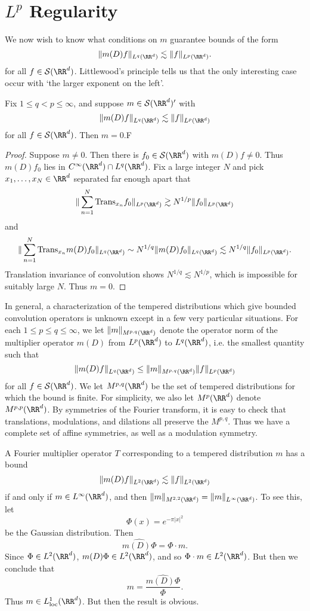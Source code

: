 \section{$L^p$ Regularity}

We now wish to know what conditions on $m$ guarantee bounds of the form
%
\[ \| m(D) f \|_{L^q(\RR^d)} \lesssim \| f \|_{L^p(\RR^d)}. \]
%
for all $f \in \mathcal{S}(\RR^d)$. Littlewood's principle tells us that the only interesting case occur with `the larger exponent on the left'.

\begin{theorem}
  Fix $1 \leq q < p \leq \infty$, and suppose $m \in \mathcal{S}(\RR^d)'$ with
  \[ \| m(D) f \|_{L^q(\RR^d)} \lesssim \| f \|_{L^p(\RR^d)} \]
  for all $f \in \mathcal{S}(\RR^d)$. Then $m = 0$.F
\end{theorem}
\begin{proof}
  Suppose $m \neq 0$. Then there is $f_0 \in \mathcal{S}(\RR^d)$ with $m(D) f \neq 0$. Thus $m(D) f_0$ lies in $C^\infty(\RR^d) \cap L^q(\RR^d)$. Fix a large integer $N$ and pick $x_1,\dots,x_N \in \RR^d$ separated far enough apart that
  \[ \| \sum_{n = 1}^N \text{Trans}_{x_n} f_0 \|_{L^p(\RR^d)} \gtrsim N^{1/p} \| f_0 \|_{L^p(\RR^d)} \]
  and
  \[ \| \sum_{n = 1}^N \text{Trans}_{x_n} m(D) f_0 \|_{L^q(\RR^d)} \sim N^{1/q} \| m(D) f_0 \|_{L^q(\RR^d)} \lesssim N^{1/q} \| f_0 \|_{L^p(\RR^d)}. \]
  Translation invariance of convolution shows $N^{1/q} \lesssim N^{1/p}$, which is impossible for suitably large $N$. Thus $m = 0$.
\end{proof}

In general, a characterization of the tempered distributions which give bounded convolution operators is unknown except in a few very particular situations. For each $1 \leq p \leq q \leq \infty$, we let $\| m \|_{M^{p,q}(\RR^d)}$ denote the operator norm of the multiplier operator $m(D)$ from $L^p(\RR^d)$ to $L^q(\RR^d)$, i.e. the smallest quantity such that
%
\[ \| m(D) f \|_{L^q(\RR^d)} \leq \| m \|_{M^{p,q}(\RR^d)} \| f \|_{L^p(\RR^d)} \]
%
for all $f \in \mathcal{S}(\RR^d)$. We let $M^{p,q}(\RR^d)$ be the set of tempered distributions for which the bound is finite. For simplicity, we also let $M^p(\RR^d)$ denote $M^{p,p}(\RR^d)$. By symmetries of the Fourier transform, it is easy to check that translations, modulations, and dilations all preserve the $M^{p,q}$. Thus we have a complete set of affine symmetries, as well as a modulation symmetry.

\begin{example}
  A Fourier multiplier operator $T$ corresponding to a tempered distribution $m$ has a bound
  \[ \| m(D)f \|_{L^2(\RR^d)} \lesssim \| f \|_{L^2(\RR^d)} \]
  if and only if $m \in L^\infty(\RR^d)$, and then $\| m \|_{M^{2,2}(\RR^d)} = \| m \|_{L^\infty(\RR^d)}$. To see this, let
  \[ \Phi(x) = e^{- \pi |x|^2} \]
  be the Gaussian distribution. Then
  \[ \widehat{m(D) \Phi} = \Phi \cdot m. \]
  Since $\Phi \in L^2(\RR^d)$, $m(D) \Phi \in L^2(\RR^d)$, and so $\Phi \cdot m \in L^2(\RR^d)$. But then we conclude that
  \[ m = \frac{\widehat{m(D) \Phi}}{\Phi}. \]
  Thus $m \in L^1_{\text{loc}}(\RR^d)$. But then the result is obvious.
\end{example}

